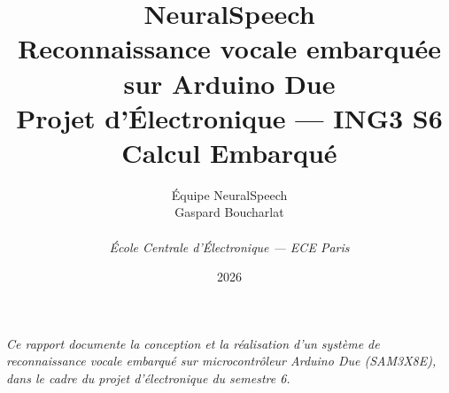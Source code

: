 \documentclass[a4paper,11pt]{article}
\title{\vspace{-2cm}
       \Huge\textbf{\textcolor{nsblue}{NeuralSpeech}}\\[0.3em]
       \Large Reconnaissance vocale embarquée sur Arduino Due\\[0.8em]
       \normalsize Projet d'Électronique --- ING3 S6 Calcul Embarqué}
\author{Équipe NeuralSpeech \\
        \small Gaspard Boucharlat \\
        \small \TODO{compléter avec les 3 autres membres}\\[1em]
        \textit{École Centrale d'Électronique --- ECE Paris}}
\date{2026}
\begin{document}
\maketitle
\thispagestyle{empty}

\vfill
\begin{center}
    \small
    \textit{Ce rapport documente la conception et la réalisation d'un système de reconnaissance vocale embarqué sur microcontrôleur Arduino Due (SAM3X8E), dans le cadre du projet d'électronique du semestre 6.}
\end{center}
\vfill

\newpage
\tableofcontents
\newpage
















\end{document}
